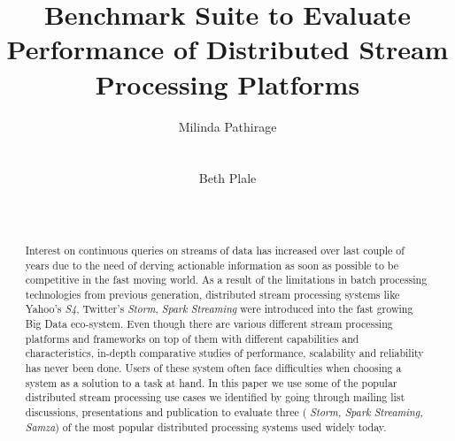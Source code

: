 \documentclass{sig-alternate}
\begin{document}
%

\title{Benchmark Suite to Evaluate Performance of Distributed Stream
  Processing Platforms}


\author{
\alignauthor
Milinda Pathirage\\
       \\
       \\
\alignauthor
Beth Plale\\
       \\
       \\
}

\maketitle
\begin{abstract}
  Interest on continuous queries on streams of data has increased over last couple of years due to
  the need of derving actionable information as soon as possible
 to be competitive in the fast moving world. As a result of the limitations
 in batch processing technologies from previous generation, distributed
 stream processing systems like Yahoo's \textit{S4}, Twitter's \textit{Storm}, \textit{Spark
 Streaming} were introduced into the fast growing Big Data eco-system.
 Even though there are various different stream processing platforms
 and frameworks on top of them with different capabilities and
 characteristics, in-depth comparative studies of performance, scalability and
 reliability has never been done. Users of these system often face
 difficulties when choosing a system as a solution to a task at hand.
 In this paper we use some of the popular distributed stream
 processing use cases we identified by going through mailing list
 discussions, presentations and publication to evaluate three (
 \textit{Storm, Spark Streaming, Samza}) of the
 most popular distributed processing systems used widely today.
\end{abstract}

\end{document}
